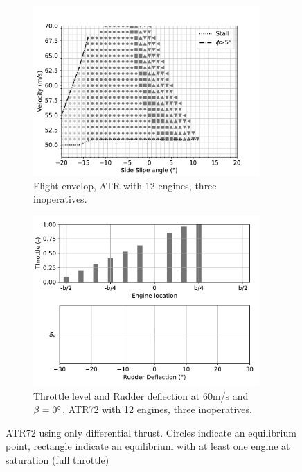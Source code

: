 \begin{figure}[hbt!]
		\centering
		\begin{subfigure}{0.49\textwidth}
			\includegraphics[width=0.95\textwidth]{DEPoriginalMapBetaVelfin1Eng15RudTrue}
			\caption{Flight envelop, ATR with 12 engines, three inoperatives.}
			\label{fig:DEPoriginalfin1_15engine}
		\end{subfigure}
		\begin{subfigure}{0.49\textwidth}
			\includegraphics[width=0.95\textwidth]{DeflDEPoriginalfin1Eng15RudTrue}
			\caption{Throttle level and Rudder deflection at 60m/s and $\beta=0\degree$, ATR72 with 12 engines, three inoperatives.}
			\label{fig:DeflDEPoriginalfin1_15Eng}
		\end{subfigure}
		\caption{ATR72 using only differential thrust. Circles indicate an equilibrium point, rectangle indicate an equilibrium with at least one engine at saturation (full throttle)}\label{DEPfin1_15engMap+Defl}
\end{figure}

